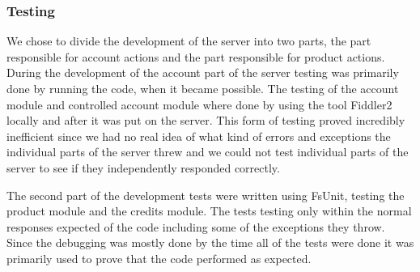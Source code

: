 \subsubsection{Testing}
We chose to divide the development of the server into two parts, the part responsible for account actions and the part responsible for product actions. During the development of the account part of the server testing was primarily done by running the code, when it became possible. The testing of the account module and controlled account module where done by using the tool Fiddler2 locally and after it was put on the server. This form of testing proved incredibly inefficient since we had no real idea of what kind of errors and exceptions the individual parts of the server threw and we could not test individual parts of the server to see if they independently responded correctly.

The second part of the development tests were written using FsUnit, testing the product module and the credits module. The tests testing only within the normal responses expected of the code including some of the exceptions they throw. Since the debugging was mostly done by the time all of the tests were done it was primarily used to prove that the code performed as expected.